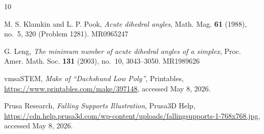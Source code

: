 \documentclass{mainresearch}
\begin{document}
\begin{thebibliography}{10}
	
	M. S. Klamkin and L. P. Pook,
	{\it Acute dihedral angles},
	Math. Mag. {\bf 61} (1988), no.~5, 320 (Problem 1281).
	MR0965247
	
	G. Leng,
	{\it The minimum number of acute dihedral angles of a simplex},
	Proc. Amer. Math. Soc. {\bf 131} (2003), no.~10, 3043--3050.
	MR1989626
	
	vmsaSTEM,
	{\it Make of ``Dachshund Low Poly''},
	Printables,
	\url{https://www.printables.com/make/397148},
	accessed May 8, 2026.
	
	Prusa Research,
	{\it Falling Supports Illustration},
	Prusa3D Help,
	\url{https://cdn.help.prusa3d.com/wp-content/uploads/fallingsupports-1-768x768.jpg},
	accessed May 8, 2026.
	
\end{thebibliography}
\end{document}
